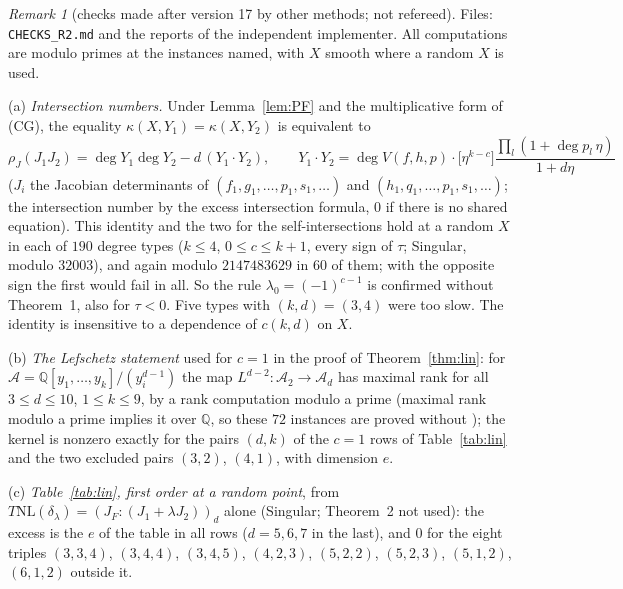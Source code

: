 \documentclass[11pt]{article}
\numberwithin{equation}{section}
\theoremstyle{remark}
\newtheorem{remark}[theorem]{Remark}
\newcommand{\QQ}{\mathbb{Q}}
\newcommand{\NL}{\mathrm{NL}}
\newcommand{\cA}{\mathcal{A}}
\newcommand{\lz}{\lambda_0}
\begin{document}
\begin{remark}[checks made after version 17 by other methods; not refereed]\label{rem:r2}
Files: \texttt{CHECKS\_R2.md} and the reports of the independent implementer. All computations are modulo primes
at the instances named, with $X$ smooth where a random $X$ is used.

(a) \emph{Intersection numbers.} Under Lemma~\ref{lem:PF} and the multiplicative form of (CG), the equality
$\kappa(X,Y_1)=\kappa(X,Y_2)$ is equivalent to
\[
\rho_J(J_1J_2)=\deg Y_1\deg Y_2-d\,(Y_1\cdot Y_2),\qquad
Y_1\cdot Y_2=\deg V(f,h,p)\cdot\bigl[\eta^{k-c}\bigr]\frac{\prod_l(1+\deg p_l\,\eta)}{1+d\eta}
\]
($J_i$ the Jacobian determinants of $(f_1,g_1,\dots,p_1,s_1,\dots)$ and $(h_1,q_1,\dots,p_1,s_1,\dots)$; the
intersection number by the excess intersection formula, $0$ if there is no shared equation). This identity and
the two for the self-intersections hold at a random $X$ in each of $190$ degree types ($k\le4$, $0\le c\le k+1$,
every sign of $\tau$; Singular, modulo $32003$), and again modulo $2147483629$ in $60$ of them; with the opposite
sign the first would fail in all. So the rule $\lz=(-1)^{c-1}$ is confirmed without Theorem~1, also for $\tau<0$.
Five types with $(k,d)=(3,4)$ were too slow. The identity is insensitive to a dependence of $c(k,d)$ on $X$.

(b) \emph{The Lefschetz statement} used for $c=1$ in the proof of Theorem~\ref{thm:lin}: for
$\cA=\QQ[y_1,\dots,y_k]/(y_i^{d-1})$ the map $L^{d-2}\colon\cA_2\to\cA_d$ has maximal rank for all $3\le d\le10$,
$1\le k\le9$, by a rank computation modulo a prime (maximal rank modulo a prime implies it over $\QQ$, so these $72$
instances are proved without \cite{St,Wa}); the kernel is nonzero exactly for the pairs $(d,k)$ of the $c=1$ rows of
Table~\ref{tab:lin} and the two excluded pairs $(3,2)$, $(4,1)$, with dimension $e$.

(c) \emph{Table~\ref{tab:lin}, first order at a random point}, from
$T\NL(\delta_\lambda)=(J_F:(J_1+\lambda J_2))_d$ alone (Singular; Theorem~2 not used): the excess is the $e$ of the
table in all rows ($d=5,6,7$ in the last), and $0$ for the eight triples
$(3,3,4)$, $(3,4,4)$, $(3,4,5)$, $(4,2,3)$, $(5,2,2)$, $(5,2,3)$, $(5,1,2)$, $(6,1,2)$ outside it.


\end{remark}
\end{document}
